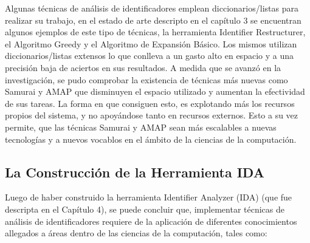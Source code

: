 Algunas técnicas de análisis de identificadores emplean diccionarios/listas para realizar su trabajo, en el estado de arte descripto en el capítulo 3 se encuentran algunos ejemplos de este tipo de técnicas, la herramienta Identifier Restructurer, el Algoritmo Greedy y el Algoritmo de Expansión Básico. Los mismos utilizan diccionarios/listas extensos lo que conlleva a un gasto alto en espacio y a una precisión baja de aciertos en sus resultados. A medida que se avanzó en la investigación, se pudo comprobar la existencia de técnicas más nuevas como Samurai y AMAP que disminuyen el espacio utilizado y aumentan la efectividad de sus tareas. La forma en que consiguen esto, es explotando más los recursos propios del sistema, y no apoyándose tanto en recursos externos. Esto a su vez permite, que las técnicas Samurai y AMAP sean más escalables a nuevas tecnologías y a nuevos vocablos en el ámbito de la ciencias de la computación.

\subsection{La Construcción de la Herramienta IDA}

Luego de haber construido la herramienta Identifier Analyzer (IDA) (que fue descripta en el Capítulo 4), se puede concluir que, implementar técnicas de análisis de identificadores requiere de la aplicación de diferentes conocimientos allegados a áreas dentro de las ciencias de la computación, tales como:

